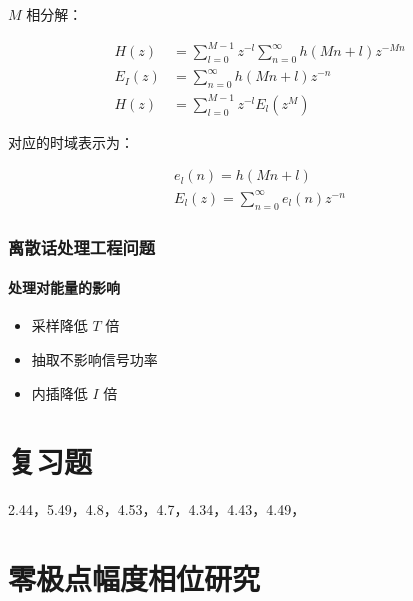 \documentclass[cn,11pt,chinese,black,simple]{elegantbook}
\begin{document}
\(M\) 相分解：

\[\begin{aligned}
    H(z) &=\sum_{l=0}^{M-1} z^{-l} \sum_{n=0}^{\infty} h(M n+l) z^{-M n} \\
    E_{I}(z) &=\sum_{n=0}^{\infty} h(M n+l) z^{-n} \\
    H(z) &=\sum_{l=0}^{M-1} z^{-l} E_{l}\left(z^{M}\right)
\end{aligned}\]

对应的时域表示为：

\[
\begin{array}{l}
e_{l}(n)=h(M n+l) \\
E_{l}(z)=\sum_{n=0}^{\infty} e_{l}(n) z^{-n}
\end{array}
\]

\subsection{离散话处理工程问题}

\subsubsection{处理对能量的影响}

\begin{itemize}
    \item 采样降低 \(T\) 倍
    \item 抽取不影响信号功率
    \item 内插降低 \(I\) 倍
\end{itemize}

\chapter{复习题}

2.44，5.49，4.8，4.53，4.7，4.34，4.43，4.49，

\appendix

\chapter{零极点幅度相位研究}




\let\chapname\undefined
\ifx\mainclass\undefined
\end{document}
